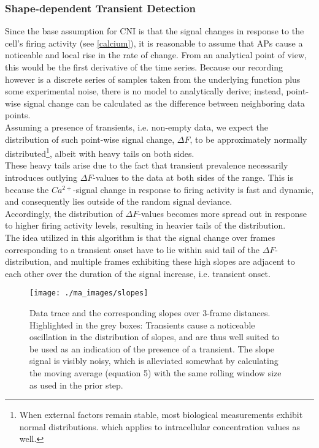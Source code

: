 \documentclass[titlepage]{article}
\begin{document}
\subsubsection{Shape-dependent Transient Detection}\label{shape}
Since the base assumption for CNI is that the signal changes in response to the cell's firing activity (see \ref{calcium}), it is reasonable to assume that APs cause a noticeable and local rise in the rate of change.  
From an analytical point of view, this would be the first derivative of the time series.
Because our recording however is a discrete series of samples taken from the underlying function plus some experimental noise, there is no model to analytically derive; instead, point-wise signal change can be calculated as the difference between neighboring data points. \\
Assuming a presence of transients, i.e. non-empty data, we expect the distribution of such point-wise signal change, $\Delta F$, to be approximately normally distributed\footnote{When external factors remain stable, most biological measurements exhibit normal distributions. which applies to intracellular concentration values as well.\cite{schmidt_physiologie_2007}}, albeit with heavy tails on both sides.\\
These heavy tails arise due to the fact that transient prevalence necessarily introduces outlying  $\Delta F$-values to the data at both sides of the range. This is because the $Ca^{2+}$-signal change in response to firing activity is fast and dynamic, and consequently lies outside of the random signal deviance.\\
Accordingly, the distribution of $\Delta F$-values becomes more spread out in response to higher firing activity levels, resulting in heavier tails of the distribution.\\
The idea utilized in this algorithm is that the signal change over frames corresponding to a transient onset have to lie within said tail of the $\Delta F$-distribution, and multiple frames exhibiting these high slopes are adjacent to each other over the duration of the signal increase, i.e. transient onset.\\
\begin{figure}[h]
\centering
\texttt{[image: ./ma\_images/slopes]}
\caption{Data trace and the corresponding slopes over 3-frame distances. Highlighted in the grey boxes: Transients cause a noticeable oscillation in the distribution of slopes, and are thus well suited to be used as an indication of the presence of a transient.\newline
The slope signal is visibly noisy, which is alleviated somewhat by calculating the moving average (equation 5) with the same rolling window size as used in the prior step.}
\label{fig:slopes}
\end{figure}
\end{document}
